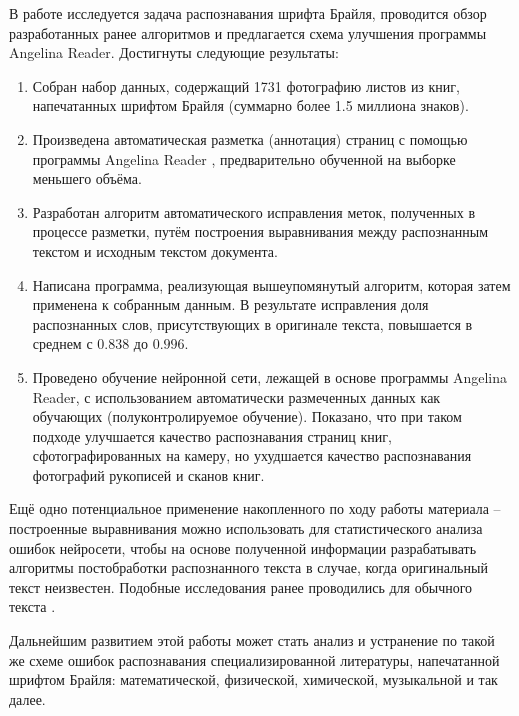 \documentclass{main.tex}[subfiles]
\begin{document}
\newpage
{}
В работе исследуется задача распознавания шрифта Брайля, проводится обзор разработанных ранее алгоритмов и предлагается схема улучшения программы Angelina Reader.
Достигнуты следующие результаты:
\begin{enumerate}[noitemsep]
    \item Собран набор данных, содержащий 1731 фотографию листов из книг, напечатанных шрифтом Брайля (суммарно более 1.5 миллиона знаков).
    \item Произведена автоматическая разметка (аннотация) страниц с помощью программы Angelina Reader \cite{ovodov2020}, предварительно обученной на выборке меньшего объёма.
    \item Разработан алгоритм автоматического исправления меток, полученных в процессе разметки, путём построения выравнивания между распознанным текстом и исходным текстом документа.
    \item Написана программа, реализующая вышеупомянутый алгоритм, которая затем применена к собранным данным.
    В результате исправления доля распознанных слов, присутствующих в оригинале текста, повышается в среднем с $ 0.838 $ до $ 0.996 $.
    \item Проведено обучение нейронной сети, лежащей в основе программы Angelina Reader, с использованием автоматически размеченных данных как обучающих (полуконтролируемое обучение).
    Показано, что при таком подходе улучшается качество распознавания страниц книг, сфотографированных на камеру, но ухудшается качество распознавания фотографий рукописей и сканов книг.
\end{enumerate}

Ещё одно потенциальное применение накопленного по ходу работы материала -- построенные выравнивания можно использовать для статистического анализа ошибок нейросети, чтобы на основе полученной информации разрабатывать алгоритмы постобработки распознанного текста в случае, когда оригинальный текст неизвестен.
Подобные исследования ранее проводились для обычного текста \cite{nguyen2019}.

Дальнейшим развитием этой работы может стать анализ и устранение по такой же схеме ошибок распознавания специализированной литературы, напечатанной шрифтом Брайля: математической, физической, химической, музыкальной и так далее.
\end{document}
